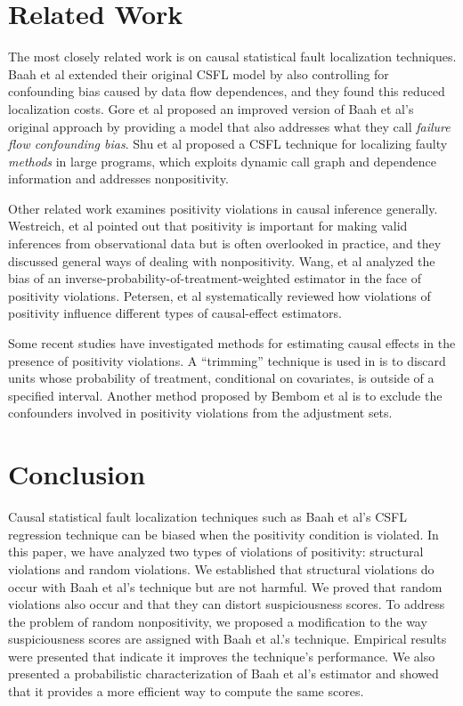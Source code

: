 \section{Related Work}
The most closely related work is on causal statistical fault localization techniques.  Baah et al \cite{baah2011mitigating} extended their original CSFL model by also controlling for confounding bias caused by data flow dependences, and they found this reduced localization costs.  Gore et al \cite{gore2012reducing} proposed an improved version of Baah et al’s original approach by providing a model that also addresses what they call {\it failure flow confounding bias}.  Shu et al \cite{shu2013mfl} proposed a CSFL technique for localizing faulty {\it methods} in large programs, which exploits dynamic call graph and dependence information and addresses nonpositivity.

Other related work examines positivity violations in causal inference generally.  Westreich, et al \cite{westreich2010invited} pointed out that positivity is important for making valid inferences from observational data but is often overlooked in practice, and they discussed general ways of dealing with nonpositivity.  Wang, et al \cite{wang2006diagnosing} analyzed the bias of an inverse-probability-of-treatment-weighted estimator in the face of positivity violations.  Petersen, et al \cite{petersen2010diagnosing} systematically reviewed how violations of positivity influence different types of causal-effect estimators.

Some recent studies have investigated methods for estimating causal effects in the presence of positivity violations. A ``trimming” technique is used in \cite{crump2006moving} is to discard units whose probability of treatment, conditional on covariates, is outside of a specified interval.  Another method proposed by Bembom et al  \cite{bembom2008data} is to exclude the confounders involved in positivity violations from the adjustment sets.  

\section{Conclusion}
Causal statistical fault localization techniques such as Baah et al’s CSFL regression technique can be biased when the positivity condition is violated.  In this paper, we have analyzed two types of violations of positivity: structural violations and random violations. We established that structural violations do occur with Baah et al’s technique but are not harmful.  We proved that random violations also occur and that they can distort suspiciousness scores.  To address the problem of random nonpositivity, we proposed a modification to the way suspiciousness scores are assigned with Baah et al.’s technique.  Empirical results were presented that indicate it improves the technique’s performance. We also presented a probabilistic characterization of Baah et al’s estimator and showed that it provides a more efficient way to compute the same scores.

